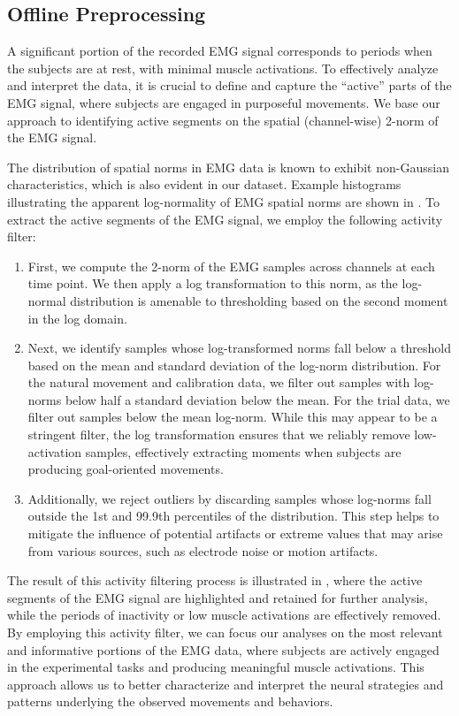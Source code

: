 \documentclass[../main.tex]{subfiles}
\begin{document}
\subsection{Offline Preprocessing}

A significant portion of the recorded EMG signal corresponds to periods when the subjects are at rest, with minimal muscle activations. To effectively analyze and interpret the data, it is crucial to define and capture the ``active'' parts of the EMG signal, where subjects are engaged in purposeful movements. We base our approach to identifying active segments on the spatial (channel-wise) 2-norm of the EMG signal.

The distribution of spatial norms in EMG data is known to exhibit non-Gaussian characteristics, which is also evident in our dataset\cite{nazarpourNoteProbabilityDistribution2013a,sangerBayesianFilteringMyoelectric2007}. Example histograms illustrating the apparent log-normality of EMG spatial norms are shown in . To extract the active segments of the EMG signal, we employ the following activity filter:

\begin{enumerate}
  \item First, we compute the 2-norm of the EMG samples across channels at each time point. We then apply a log transformation to this norm, as the log-normal distribution is amenable to thresholding based on the second moment in the log domain. 
  \item Next, we identify samples whose log-transformed norms fall below a threshold based on the mean and standard deviation of the log-norm distribution. For the natural movement and calibration data, we filter out samples with log-norms below half a standard deviation below the mean. For the trial data, we filter out samples below the mean log-norm. While this may appear to be a stringent filter, the log transformation ensures that we reliably remove low-activation samples, effectively extracting moments when subjects are producing goal-oriented movements.
  \item Additionally, we reject outliers by discarding samples whose log-norms fall outside the 1st and 99.9th percentiles of the distribution. This step helps to mitigate the influence of potential artifacts or extreme values that may arise from various sources, such as electrode noise or motion artifacts.
\end{enumerate}

The result of this activity filtering process is illustrated in , where the active segments of the EMG signal are highlighted and retained for further analysis, while the periods of inactivity or low muscle activations are effectively removed. By employing this activity filter, we can focus our analyses on the most relevant and informative portions of the EMG data, where subjects are actively engaged in the experimental tasks and producing meaningful muscle activations. This approach allows us to better characterize and interpret the neural strategies and patterns underlying the observed movements and behaviors.
\end{document}
